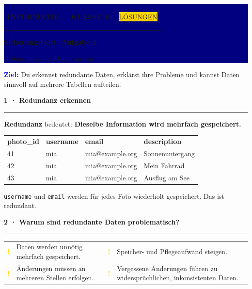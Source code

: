 \documentclass[10pt,a4paper]{article}
\newcommand{\sectiontitle}[1]{%
  \vspace{2.3mm}
  {\color{Blue}\bfseries\large #1}\par
  \vspace{0.8mm}
  {\color{Blue}\rule{\linewidth}{0.7pt}}\par
  \vspace{1.2mm}
}
\begin{document}
\colorbox{Navy}{%
  \parbox{\dimexpr\linewidth-2\fboxsep\relax}{%
    \vspace{3mm}\color{white}
    \begin{tabularx}{\linewidth}{@{}Xr@{}}
      {\small\bfseries INFORMATIK · KLASSE 10} &
      \colorbox{Gold}{\color{Navy}\small\bfseries\strut LÖSUNGEN}
    \end{tabularx}
    \vspace{2.5mm}

    {\fontsize{22}{25}\selectfont\bfseries Sicherungsblatt: Aufgabe 2}\par
    \vspace{1mm}
    {\large Redundanzen in Datenbanken}
    \vspace{3mm}
  }%
}

\vspace{3mm}
\colorbox{Sky}{%
  \parbox{\dimexpr\linewidth-2\fboxsep\relax}{%
    \vspace{1.8mm}
    \textcolor{Blue}{\bfseries Ziel:}
    Du erkennst redundante Daten, erklärst ihre Probleme und kannst Daten
    sinnvoll auf mehrere Tabellen aufteilen.
    \vspace{1.8mm}
  }%
}

\sectiontitle{1 · Redundanz erkennen}

\textbf{Redundanz} bedeutet: \textbf{Dieselbe Information wird mehrfach gespeichert.}

\vspace{1.5mm}
\renewcommand{\arraystretch}{1.2}
\begin{tabularx}{\linewidth}{@{}>{\ttfamily\small}p{16mm}>{\ttfamily\small}p{25mm}>{\ttfamily\small}p{47mm}X@{}}
  \rowcolor{Sky}\bfseries photo\_id & \bfseries username & \bfseries email & \bfseries description \\
  41 & mia & mia@example.org & Sonnenuntergang \\
  \rowcolor{CodeBg}42 & mia & mia@example.org & Mein Fahrrad \\
  43 & mia & mia@example.org & Ausflug am See \\
\end{tabularx}

\vspace{1.4mm}
\colorbox{CodeBg}{\parbox{\dimexpr\linewidth-2\fboxsep\relax}{%
  \texttt{username} und \texttt{email} werden für jedes Foto wiederholt gespeichert.
  Das ist redundant.
}}

\sectiontitle{2 · Warum sind redundante Daten problematisch?}

\begin{tabularx}{\linewidth}{@{}p{7mm}X p{7mm}X@{}}
  \textcolor{Gold}{\Large\bfseries !} & Daten werden unnötig mehrfach gespeichert. &
  \textcolor{Gold}{\Large\bfseries !} & Speicher- und Pflegeaufwand steigen. \\[1mm]
  \textcolor{Gold}{\Large\bfseries !} & Änderungen müssen an mehreren Stellen erfolgen. &
  \textcolor{Gold}{\Large\bfseries !} & Vergessene Änderungen führen zu widersprüchlichen, inkonsistenten Daten. \\
\end{tabularx}
\end{document}
